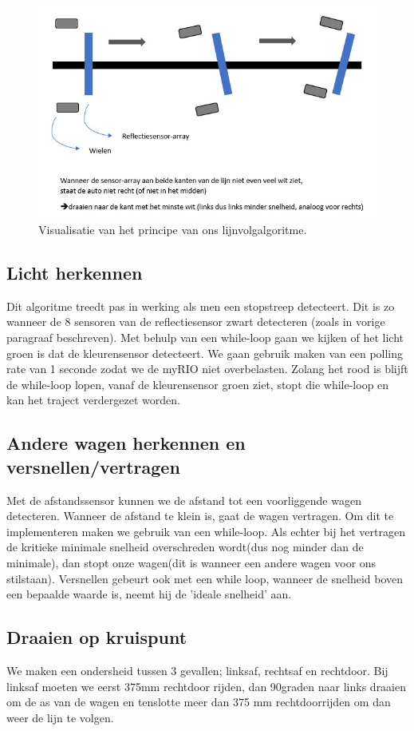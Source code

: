 \documentclass[a4paper,twoside,kulak]{kulakreport}
\begin{document}
	\begin{figure}
		\centering
		\includegraphics[width=.84\textwidth]{pref2}
		\caption{Visualisatie van het principe van ons lijnvolgalgoritme.
		}
		\label{fig: lijnvolg}
		
	\end{figure}
	\subsection{Licht herkennen}
	Dit algoritme treedt pas in werking als men een stopstreep detecteert. Dit is zo wanneer de 8 sensoren van de reflectiesensor zwart detecteren (zoals in vorige paragraaf beschreven). Met behulp van een while-loop gaan we kijken of het licht groen is dat de kleurensensor detecteert. We gaan gebruik maken van een polling rate van 1 seconde zodat we de myRIO niet overbelasten. Zolang het rood is blijft de while-loop lopen, vanaf de kleurensensor groen ziet, stopt die while-loop en kan het traject verdergezet worden.
	
	\subsection{Andere wagen herkennen en versnellen/vertragen}
	
	Met de afstandssensor kunnen we de afstand tot een voorliggende wagen detecteren. Wanneer de afstand te klein is, gaat de wagen vertragen. Om dit te implementeren  maken we gebruik van een while-loop. Als echter bij het vertragen de kritieke minimale snelheid overschreden wordt(dus nog minder dan de minimale), dan stopt onze wagen(dit is wanneer een andere wagen voor ons stilstaan). Versnellen gebeurt ook met een while loop, wanneer de snelheid boven een bepaalde waarde is, neemt hij de 'ideale snelheid' aan.
	
	\subsection{Draaien op kruispunt}
	We maken een ondersheid tussen 3 gevallen; linksaf, rechtsaf en rechtdoor. Bij linksaf moeten we eerst 375mm rechtdoor rijden, dan 90graden naar links draaien om de as van de wagen en tenslotte meer dan 375 mm rechtdoorrijden om dan weer de lijn te volgen.
	
\end{document}

